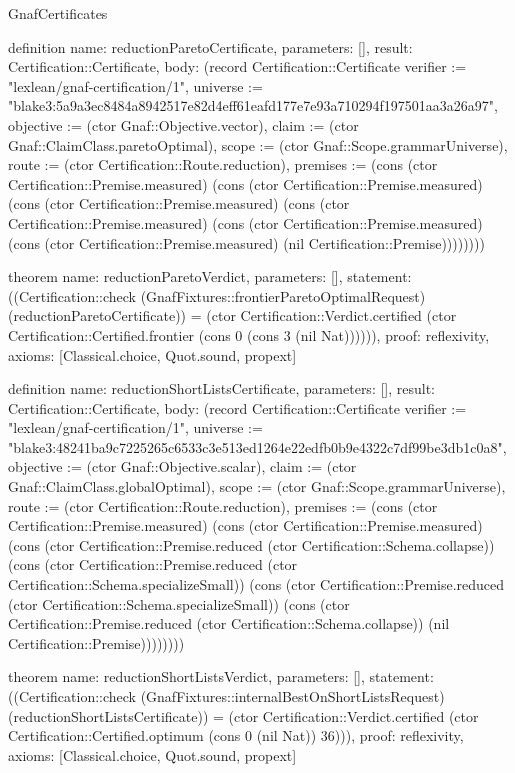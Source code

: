 \begin{lexlean}{GnafCertificates}
\begin{semanticmodule}
definition{
  name: reductionParetoCertificate,
  parameters: [],
  result: Certification::Certificate,
  body: (record Certification::Certificate {verifier := "lexlean/gnaf-certification/1", universe := "blake3:5a9a3ec8484a8942517e82d4eff61eafd177e7e93a710294f197501aa3a26a97", objective := (ctor Gnaf::Objective.vector), claim := (ctor Gnaf::ClaimClass.paretoOptimal), scope := (ctor Gnaf::Scope.grammarUniverse), route := (ctor Certification::Route.reduction), premises := (cons (ctor Certification::Premise.measured) (cons (ctor Certification::Premise.measured) (cons (ctor Certification::Premise.measured) (cons (ctor Certification::Premise.measured) (cons (ctor Certification::Premise.measured) (cons (ctor Certification::Premise.measured) (nil Certification::Premise)))))))})
}

theorem{
  name: reductionParetoVerdict,
  parameters: [],
  statement: ((Certification::check (GnafFixtures::frontierParetoOptimalRequest) (reductionParetoCertificate)) = (ctor Certification::Verdict.certified (ctor Certification::Certified.frontier (cons 0 (cons 3 (nil Nat)))))),
  proof: reflexivity{},
  axioms: [Classical.choice, Quot.sound, propext]
}

definition{
  name: reductionShortListsCertificate,
  parameters: [],
  result: Certification::Certificate,
  body: (record Certification::Certificate {verifier := "lexlean/gnaf-certification/1", universe := "blake3:48241ba9c7225265c6533c3e513ed1264e22edfb0b9e4322c7df99be3db1c0a8", objective := (ctor Gnaf::Objective.scalar), claim := (ctor Gnaf::ClaimClass.globalOptimal), scope := (ctor Gnaf::Scope.grammarUniverse), route := (ctor Certification::Route.reduction), premises := (cons (ctor Certification::Premise.measured) (cons (ctor Certification::Premise.measured) (cons (ctor Certification::Premise.reduced (ctor Certification::Schema.collapse)) (cons (ctor Certification::Premise.reduced (ctor Certification::Schema.specializeSmall)) (cons (ctor Certification::Premise.reduced (ctor Certification::Schema.specializeSmall)) (cons (ctor Certification::Premise.reduced (ctor Certification::Schema.collapse)) (nil Certification::Premise)))))))})
}

theorem{
  name: reductionShortListsVerdict,
  parameters: [],
  statement: ((Certification::check (GnafFixtures::internalBestOnShortListsRequest) (reductionShortListsCertificate)) = (ctor Certification::Verdict.certified (ctor Certification::Certified.optimum (cons 0 (nil Nat)) 36))),
  proof: reflexivity{},
  axioms: [Classical.choice, Quot.sound, propext]
}


\end{semanticmodule}
\end{lexlean}
